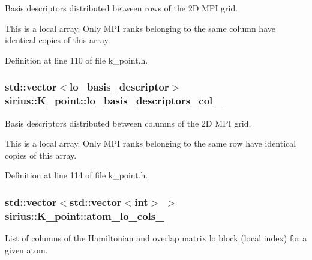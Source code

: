 Basis descriptors distributed between rows of the 2\+D M\+P\+I grid. 

This is a local array. Only M\+P\+I ranks belonging to the same column have identical copies of this array. 

Definition at line 110 of file k\+\_\+point.\+h.

\hypertarget{classsirius_1_1_k__point_a6483b599581ba095c971ee04c2d61b06}{}
\subsubsection[{lo\+\_\+basis\+\_\+descriptors\+\_\+col\+\_\+}]{\setlength{\rightskip}{0pt plus 5cm}std\+::vector$<${\bf lo\+\_\+basis\+\_\+descriptor}$>$ sirius\+::\+K\+\_\+point\+::lo\+\_\+basis\+\_\+descriptors\+\_\+col\+\_\+\hspace{0.3cm}{\ttfamily [private]}}\label{classsirius_1_1_k__point_a6483b599581ba095c971ee04c2d61b06}


Basis descriptors distributed between columns of the 2\+D M\+P\+I grid. 

This is a local array. Only M\+P\+I ranks belonging to the same row have identical copies of this array. 

Definition at line 114 of file k\+\_\+point.\+h.

\hypertarget{classsirius_1_1_k__point_a60c93116b6de3660cd0375f4e268e1ae}{}
\subsubsection[{atom\+\_\+lo\+\_\+cols\+\_\+}]{\setlength{\rightskip}{0pt plus 5cm}std\+::vector$<$std\+::vector$<$int$>$ $>$ sirius\+::\+K\+\_\+point\+::atom\+\_\+lo\+\_\+cols\+\_\+\hspace{0.3cm}{\ttfamily [private]}}\label{classsirius_1_1_k__point_a60c93116b6de3660cd0375f4e268e1ae}


List of columns of the Hamiltonian and overlap matrix lo block (local index) for a given atom. 



